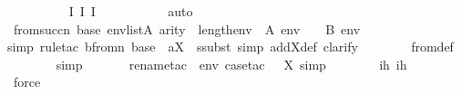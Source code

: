 \begin{isabellebody}
\ \ \ \ \ \ \ \ \isamarkupfalse%
\ I{}\ I{}\ I{}\ \isanewline
\ \ \ \ \ \ \ \ \isamarkupfalse%
\ auto\ \isanewline
\ \ \ \ \isamarkupfalse%
\isanewline
\ \ \ \ \ \ \ \ \isanewline
\ \ \ \ \isamarkupfalse%
\ {\isachardoublequoteopen}{\isasymforall}{\isasymphi}{\isasymin}{\isasymDelta}{}{\isacharunderscore}{\kern0pt}from{\isacharcircum}{\kern0pt}succ{\isacharparenleft}{\kern0pt}n{\isacharparenright}{\kern0pt}\ {\isacharparenleft}{\kern0pt}{\isasymDelta}{}{\isacharunderscore}{\kern0pt}base{\isacharparenright}{\kern0pt}{\isachardot}{\kern0pt}\ {\isasymforall}env{\isasymin}list{\isacharparenleft}{\kern0pt}A{\isacharparenright}{\kern0pt}{\isachardot}{\kern0pt}\ arity{\isacharparenleft}{\kern0pt}{\isasymphi}{\isacharparenright}{\kern0pt}\ {\isasymle}\ length{\isacharparenleft}{\kern0pt}env{\isacharparenright}{\kern0pt}\ {\isasymlongrightarrow}\ A{\isacharcomma}{\kern0pt}\ env\ {\isasymTurnstile}\ {\isasymphi}\ {\isasymlongleftrightarrow}\ B{\isacharcomma}{\kern0pt}\ env\ {\isasymTurnstile}\ {\isasymphi}{\isachardoublequoteclose}\ \isanewline
\ \ \ \ \ \ \isamarkupfalse%
{\isacharparenleft}{\kern0pt}simp{\isacharcomma}{\kern0pt}\ rule{\isacharunderscore}{\kern0pt}tac\ b{\isacharequal}{\kern0pt}{\isachardoublequoteopen}{\isasymDelta}{}{\isacharunderscore}{\kern0pt}from{\isacharcircum}{\kern0pt}n\ {\isacharparenleft}{\kern0pt}{\isasymDelta}{}{\isacharunderscore}{\kern0pt}base{\isacharparenright}{\kern0pt}{\isachardoublequoteclose}\ \ a{\isacharequal}{\kern0pt}X\ \ ssubst{\isacharcomma}{\kern0pt}\ simp\ add{\isacharcolon}{\kern0pt}X{\isacharunderscore}{\kern0pt}def{\isacharcomma}{\kern0pt}\ clarify{\isacharparenright}{\kern0pt}\isanewline
\ \ \ \ \ \ \isamarkupfalse%
\ {\isasymDelta}{}{\isacharunderscore}{\kern0pt}from{\isacharunderscore}{\kern0pt}def\ \isanewline
\ \ \ \ \ \ \isamarkupfalse%
\ simp\isanewline
\ \ \ \ \ \ \isamarkupfalse%
{\isacharparenleft}{\kern0pt}rename{\isacharunderscore}{\kern0pt}tac\ {\isasymphi}\ env{\isacharcomma}{\kern0pt}\ case{\isacharunderscore}{\kern0pt}tac\ {\isachardoublequoteopen}{\isasymphi}\ {\isasymin}\ X{\isachardoublequoteclose}{\isacharcomma}{\kern0pt}\ simp{\isacharparenright}{\kern0pt}\isanewline
\ \ \ \ \ \ \isamarkupfalse%
\ ih{}\ ih{}\ \isanewline
\ \ \ \ \ \ \ \isamarkupfalse%
\ force\isanewline
\ \ \ \ \ \ \isamarkupfalse%

\end{isabellebody}
